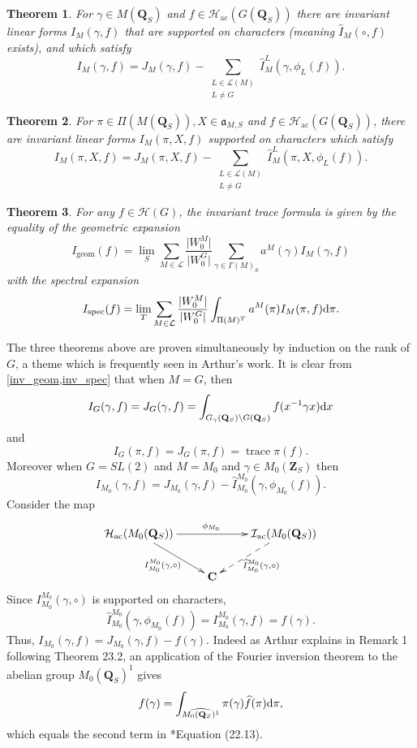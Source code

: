 \documentclass[11pt]{amsart}
\def\C{\mathbf C}
\def\Q{\mathbf Q}
\def\Z{\mathbf Z}
\def\HHH{\mathcal H}
\def\III{\mathcal I}
\def\LLL{\mathcal L}
\def\aaa{\mathfrak a}
\def\d{\text d}
\def\bs{\setminus}
\def\mod#1{\lvert #1 \rvert} %
\def\trace{\operatorname{trace}}
\newtheorem{theorem}{Theorem}[section]
\theoremstyle{remark}
\begin{document}
\begin{theorem} \label{inv_geom}
For $\gamma \in M(\Q_S)$ and $f \in \HHH_{\text{ac}}(G(\Q_S))$ there are invariant linear forms $I_M(\gamma, f)$ that are supported on characters (meaning $\widehat I_M(\circ, f)$ exists), and which satisfy 
\[ I_M(\gamma, f) = J_M(\gamma, f) - \sum_{\substack{L \in \LLL(M) \\ L \neq G}} \widehat I_M^L(\gamma, \phi_L(f)). \]
\end{theorem}

\begin{theorem} \label{inv_spec}
For $\pi \in \Pi(M(\Q_S)), X \in \aaa_{M, S}$ and $f \in \HHH_{\text{ac}}(G(\Q_S))$, there are invariant linear forms $I_M(\pi, X, f)$ supported on characters which satisfy
\[ I_M(\pi, X, f) = J_M(\pi, X, f) - \sum_{\substack{L \in \LLL(M) \\ L \neq G}} \widehat I_M^L(\pi, X, \phi_L(f)). \]
\end{theorem}

\begin{theorem} \label{invtf}
For any $f \in \HHH(G)$, the invariant trace formula is given by the equality of the geometric expansion
\[ I_{\text{geom}}(f) = \lim_S \sum_{M \in \LLL} \frac{\mod{W_0^M}}{\mod{W_0^G}} \sum_{\gamma \in \Gamma(M)_S} a^M(\gamma) I_M(\gamma, f) \]
with the spectral expansion
\[ I_{\text{spec}}(f) = \lim_T \sum_{M \in \LLL} \frac{\mod{W_0^M}}{\mod{W_0^G}} \int_{\Pi(M)^T} a^M(\pi) I_M(\pi, f) \d \pi. \]
\end{theorem}

The three theorems above are proven simultaneously by induction on the rank of $G$, a theme which is frequently seen in Arthur's work. It is clear from \cref{inv_geom,inv_spec} that when $M=G$, then
\[ I_G(\gamma, f) = J_G(\gamma, f) = \int_{G_\gamma(\Q_S)\bs G(\Q_S)} f(x^{-1}\gamma x) \d x \]
and 
\[ I_G(\pi, f) = J_G(\pi, f) = \trace \pi(f). \]
Moreover when $G = SL(2)$ and $M = M_0$ and $\gamma \in M_0(\Z_S)$ then 
\[ I_{M_0}(\gamma, f) = J_{M_0}(\gamma, f) - \widehat I_{M_0}^{M_0} (\gamma, \phi_{M_0}(f)). \]
Consider the map
\[ \xymatrix{\HHH_{\text{ac}}(M_0(\Q_S)) \ar[rr]^{\phi_{M_0}}  \ar[dr]_{I_{M_0}^{M_0}(\gamma, \circ)} && \III_{\text{ac}}(M_0(\Q_S)) \ar@{-->}[dl]^{\widehat I_{M_0}^{M_0} (\gamma, \circ)} \\ & \C & } \]
Since $I_{M_0}^{M_0}(\gamma, \circ)$ is supported on characters, 
\[ \widehat I_{M_0}^{M_0}(\gamma, \phi_{M_0}(f)) = I_{M_0}^{M_0}(\gamma, f) = f(\gamma). \]
Thus, $I_{M_0}(\gamma, f) = J_{M_0}(\gamma, f) - f(\gamma)$. Indeed as Arthur explains in Remark 1 following Theorem 23.2, an application of the Fourier inversion theorem to the abelian group $M_0(\Q_S)^1$ gives
\begin{equation} \label{f_gamma}
f(\gamma) = \int_{\widehat{M_0(\Q_S)^1}} \pi(\gamma) \widehat f(\pi) \d \pi, 
\end{equation}
which equals the second term in \cite{clay}*{Equation (22.13)}. 
\end{document}
